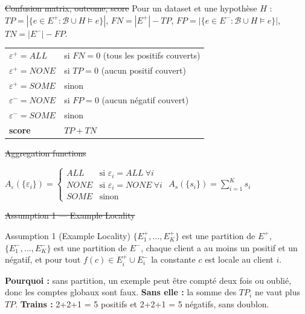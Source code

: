 \documentclass[10pt]{article}
\begin{document}
\st{Confusion matrix, outcome, score}
Pour un dataset et une hypothèse $H$ : $TP=|\{e\in E^+:\mathcal{B}\cup H\models e\}|$, $FN=|E^+|-TP$,
$FP=|\{e\in E^-:\mathcal{B}\cup H\models e\}|$, $TN=|E^-|-FP$.
\begin{center}
\begin{tabular}{@{}l l@{}}
$\varepsilon^+=\mathit{ALL}$ & si $FN=0$ (tous les positifs couverts)\\
$\varepsilon^+=\mathit{NONE}$ & si $TP=0$ (aucun positif couvert)\\
$\varepsilon^+=\mathit{SOME}$ & sinon\\
$\varepsilon^-=\mathit{NONE}$ & si $FP=0$ (aucun négatif couvert)\\
$\varepsilon^-=\mathit{SOME}$ & sinon\\
\textbf{score} & $TP+TN$\\
\end{tabular}
\end{center}

\st{Aggregation functions}
\begin{center}
$A_\varepsilon(\{\varepsilon_i\})=\begin{cases}\mathit{ALL}&\text{si }\varepsilon_i=\mathit{ALL}\ \forall i\\ \mathit{NONE}&\text{si }\varepsilon_i=\mathit{NONE}\ \forall i\\ \mathit{SOME}&\text{sinon}\end{cases}$
\qquad $A_s(\{s_i\})=\sum_{i=1}^{K}s_i$
\end{center}


\st{Assumption 1 --- Example Locality}
\begin{enonce}{Assumption 1 (Example Locality)}
$\{E_1^+,\dots,E_K^+\}$ est une partition de $E^+$, $\{E_1^-,\dots,E_K^-\}$ est une partition de $E^-$,
chaque client a au moins un positif et un négatif, et pour tout $f(c)\in E_i^+\cup E_i^-$ la constante $c$ est locale au client $i$.
\end{enonce}
\textbf{Pourquoi :} sans partition, un exemple peut être compté deux fois ou oublié, donc les comptes globaux sont faux.
\textbf{Sans elle :} la somme des $TP_i$ ne vaut plus $TP$.
\textbf{Trains :} 2+2+1 = 5 positifs et 2+2+1 = 5 négatifs, sans doublon.
\end{document}

